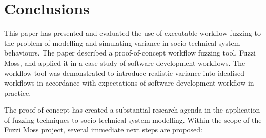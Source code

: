 \documentclass{sig-alternate}
\begin{document}

\section{Conclusions}
\label{sec:conclusions}


This paper has presented and evaluated the use of executable workflow fuzzing to the problem of modelling and simulating
variance in socio-technical system behaviours.  The paper described a proof-of-concept workflow fuzzing tool, Fuzzi
Moss, and applied it in a case study of software development workflows.  The workflow tool was demonstrated to introduce
realistic variance into idealised workflows in accordance with expectations of software development workflow in
practice.

The proof of concept has created a substantial research agenda in the application of fuzzing techniques to
socio-technical system modelling.  Within the scope of the Fuzzi Moss project, several immediate next steps are
proposed:
\end{document}
